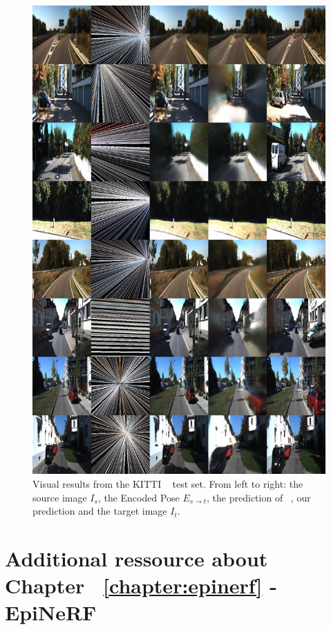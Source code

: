 \begin{figure}[htp!]
    \begin{center}
    \includegraphics[width=.9\textwidth]{images/epipolarnvs/SuppMat_KITTI.jpg}
    \end{center}
     \caption{Visual results from the KITTI ~\cite{KITTI} test set. From left to right: the source image  $I_s$, the Encoded Pose $E_{s\xrightarrow{}t}$,  the prediction of ~\cite{NVS_skip}, our prediction and the target image $I_t$.}
     \label{fig:add_visKITTI}
\end{figure}


\newpage
\section{Additional ressource about Chapter ~\ref{chapter:epinerf} - EpiNeRF}

